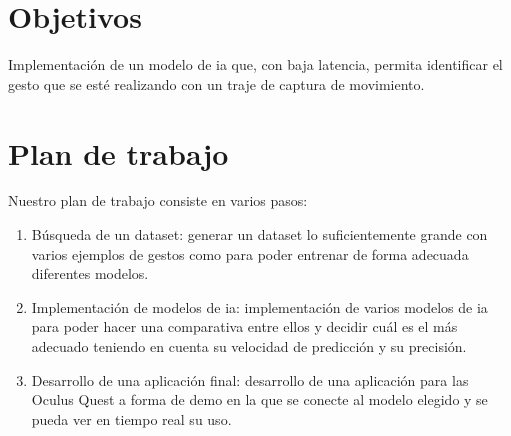 \section{Objetivos}
Implementación de un modelo de \gls{ia} que, con baja latencia, permita identificar el gesto que se esté realizando con un traje de captura de movimiento.

\section{Plan de trabajo}
Nuestro plan de trabajo consiste en varios pasos:
\begin{enumerate}
	\item Búsqueda de un dataset: generar un dataset lo suficientemente grande con varios ejemplos de gestos como para poder entrenar de forma adecuada diferentes modelos.
	\item Implementación de modelos de \gls{ia}: implementación de varios modelos de \gls{ia} para poder hacer una comparativa entre ellos y decidir cuál es el más adecuado teniendo en cuenta su velocidad de predicción y su precisión.
	\item Desarrollo de una aplicación final: desarrollo de una aplicación para las Oculus Quest a forma de demo en la que se conecte al modelo elegido y se pueda ver en tiempo real su uso.
\end{enumerate}